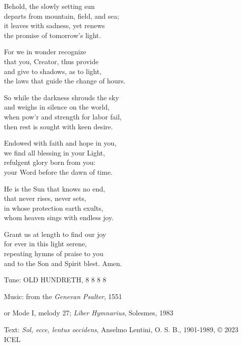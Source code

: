 \hymn

\begin{hymnverse}
Behold, the slowly setting sun\\
departs from mountain, field, and sea;\\
it leaves with sadness, yet renews\\
the promise of tomorrow’s light.

For we in wonder recognize\\
that you, Creator, thus provide\\
and give to shadows, as to light,\\
the laws that guide the change of hours.

So while the darkness shrouds the sky\\
and weighs in silence on the world,\\
when pow’r and strength for labor fail,\\
then rest is sought with keen desire.

Endowed with faith and hope in you,\\
we find all blessing in your Light,\\
refulgent glory born from you:\\
your Word before the dawn of time.

He is the Sun that knows no end,\\
that never rises, never sets,\\
in whose protection earth exults,\\
whom heaven sings with endless joy.

Grant us at length to find our joy\\
for ever in this light serene,\\
repeating hymns of praise to you\\
and to the Son and Spirit blest. Amen.
\end{hymnverse}

\begin{hymnsource}
Tune: OLD HUNDRETH, 8 8 8 8

Music: from the \emph{Genevan Psalter}, 1551

or Mode I, melody 27; \emph{Liber Hymnarius}, Solesmes, 1983

Text: \emph{Sol, ecce, lentus occidens}, Anselmo Lentini, O. S. B., 1901-1989, © 2023 ICEL
\end{hymnsource}